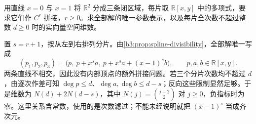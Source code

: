 \begin{optionalexercise}\label{b3:ex:21-spline-strips}
	用直线 \(x=0\) 与 \(x=1\) 将 \(\mathbb R^2\) 分成三条闭区域，每片取 \(\mathbb R[x,y]\) 中的多项式，要求它们作 \(C^r\) 拼接，\(r\ge0\)。求全部解的唯一参数表示，以及每片全次数不超过整数 \(d\ge0\) 时的实向量空间维数。
\end{optionalexercise}
\begin{solution}
	置 \(s=r+1\)，按从左到右排列分片。由\cref{b3:prop:spline-divisibility}，全部解唯一写成
	\[
		(p_1,p_2,p_3)=\bigl(p,\ p+x^sa,\ p+x^sa+(x-1)^sb\bigr), \qquad p,a,b\in\mathbb R[x,y].
	\]
	两条直线不相交，因此没有内部顶点的额外拼接问题。若三个分片次数均不超过 \(d\)，由逐次作差可知 \(\deg p\le d\)、\(\deg a,\deg b\le d-s\)；反向这些限制显然足够。于是维数为 \(N(d)+2N(d-s)\)，其中 \(N(j)=\binom{j+2}{2}\) 对 \(j\ge0\)，负指标时为零。这里关系含常数，使用的是次数滤过；不能未经说明就把 \((x-1)^s\) 当成齐次元。
\end{solution}

